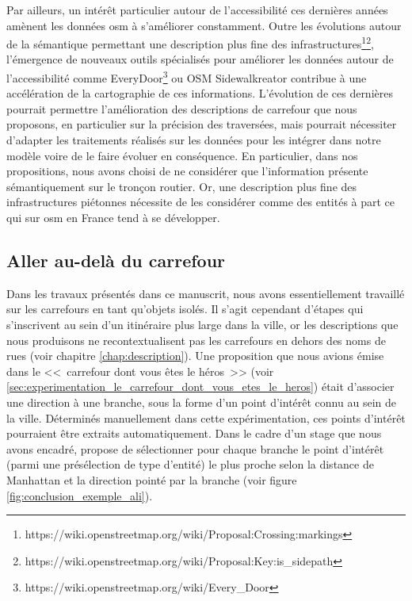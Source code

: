 Par ailleurs, un intérêt particulier autour de l'accessibilité ces dernières années amènent les données \gls{osm} à s'améliorer constamment. Outre les évolutions autour de la sémantique permettant une description plus fine des infrastructures\footnote{https://wiki.openstreetmap.org/wiki/Proposal:Crossing:markings}\footnote{https://wiki.openstreetmap.org/wiki/Proposal:Key:is\_sidepath}, l'émergence de nouveaux outils spécialisés pour améliorer les données autour de l'accessibilité comme EveryDoor\footnote{https://wiki.openstreetmap.org/wiki/Every\_Door} ou OSM Sidewalkreator \citep{demoraesvestena2023} contribue à une accélération de la cartographie de ces informations. L'évolution de ces dernières pourrait permettre l'amélioration des descriptions de carrefour que nous proposons, en particulier sur la précision des traversées, mais pourrait nécessiter d'adapter les traitements réalisés sur les données pour les intégrer dans notre modèle voire de le faire évoluer en conséquence. En particulier, dans nos propositions, nous avons choisi de ne considérer que l'information présente sémantiquement sur le tronçon routier. Or, une description plus fine des infrastructures piétonnes nécessite de les considérer comme des entités à part ce qui sur \gls{osm} en France tend à se développer.

\subsection{Aller au-delà du carrefour}

Dans les travaux présentés dans ce manuscrit, nous avons essentiellement travaillé sur les carrefours en tant qu'objets isolés. Il s'agit cependant d'étapes qui s'inscrivent au sein d'un itinéraire \citep{gaunet_verbal_2006} plus large dans la ville, or les descriptions que nous produisons ne recontextualisent pas les carrefours en dehors des noms de rues (voir chapitre \ref{chap:description}). Une proposition que nous avions émise dans le <<~carrefour dont vous êtes le héros~>> (voir \ref{sec:experimentation_le_carrefour_dont_vous_etes_le_heros}) était d'associer une direction à une branche, sous la forme d'un point d'intérêt connu au sein de la ville. Déterminés manuellement dans cette expérimentation, ces points d'intérêt pourraient être extraits automatiquement. Dans le cadre d'un stage que nous avons encadré, \citet{aouini2023} propose de sélectionner pour chaque branche le point d'intérêt (parmi une présélection de type d'entité) le plus proche selon la distance de Manhattan et la direction pointé par la branche (voir figure \ref{fig:conclusion_exemple_ali}).

